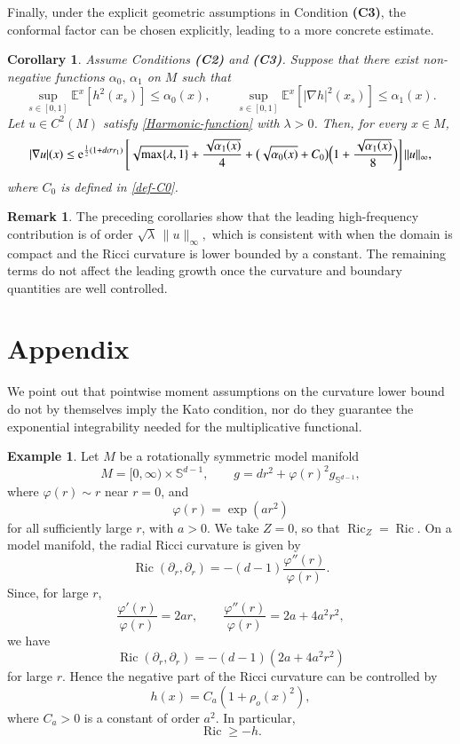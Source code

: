 \documentclass[11pt,twoside, reqno]{article}
\def\e{{\rm e}}
\newcommand\1{\mathbbm{1}}
\newtheorem{corollary}[theorem]{Corollary}
\theoremstyle{definition}
\newtheorem{remark}[theorem]{Remark}
\newtheorem{example}{Example}[section]
\numberwithin{equation}{section}
\def \e{{\rm e}}
\begin{document}
Finally, under the explicit
geometric assumptions in Condition {\bf(C3)}, the conformal factor can be
chosen explicitly, leading to a more concrete estimate.

\begin{corollary}
\label{cor:neumann-eigen-explicit-nonconvex}
Assume Conditions {\bf (C2)} and {\bf (C3)}. 
Suppose that there exist non-negative functions \( \alpha_0,\, \alpha_1\) on \(M\)
such that
\[
        \sup_{s\in [0,1]}\mathbb E^x[h^2(x_s)]\leq  {\alpha}_0(x),
        \qquad
        \sup_{s\in [0,1] }\mathbb E^x[|\nabla h|^2(x_s)]
        \leq  {\alpha}_1(x).
\]
Let \(u\in C^2(M)\) satisfy \eqref{Harmonic-function} with \(\lambda>0\). Then, for every \(x\in M\),
\[
        |\nabla u|(x)
        \leq
        \e^{\frac12(1+d\sigma r_1)}
        \left[
        \sqrt{\max\{\lambda,  1\}}
        +
        \frac{\sqrt{ {\alpha}_1(x)}}{4}
        +
        \bigl(\sqrt{ {\alpha}_0(x)}+C_0\bigr)
       \Bigl(1+ \frac{\sqrt{{\alpha}_1(x)}}{8}\Bigr) \right]
        \|u\|_{\infty},
\]
where $C_0$ is defined in \eqref{def-C0}. 
\end{corollary}


\begin{remark}
The preceding corollaries show that the leading high-frequency contribution is
of order
\(
        \sqrt{\lambda}\,\|u\|_{\infty},
\)
which is consistent with \cite{ArnaudonThalmaierWang2020} when the domain is compact
and the Ricci curvature is lower bounded by a constant.  The remaining terms do not affect the leading growth
 once the curvature and
boundary quantities are well controlled. 
\end{remark}

\section{Appendix}

We point out that pointwise moment assumptions on the curvature lower bound
do not by themselves imply the Kato condition, nor do they guarantee the
exponential integrability needed for the multiplicative functional.

\begin{example}\label{no-Kato}
Let \(M\) be a rotationally symmetric model manifold
\[
        M=[0,\infty)\times \mathbb S^{d-1},
        \qquad
        g=dr^2+\varphi(r)^2 g_{\mathbb S^{d-1}},
\]
where \(\varphi(r)\sim r\) near \(r=0\), and
\[
        \varphi(r)=\exp(ar^2)
\]
for all sufficiently large \(r\), with \(a>0\). We take \(Z=0\), so that
\(\operatorname{Ric}_Z=\operatorname{Ric}\). 
On a model manifold, the radial
Ricci curvature is given by
\[
        \operatorname{Ric}(\partial_r,\partial_r)
        =
        -(d-1)\frac{\varphi''(r)}{\varphi(r)}.
\]
Since, for large \(r\),
\[
        \frac{\varphi'(r)}{\varphi(r)}=2ar,
        \qquad
        \frac{\varphi''(r)}{\varphi(r)}
        =
        2a+4a^2r^2,
\]
we have
\[
        \operatorname{Ric}(\partial_r,\partial_r)
        =
        -(d-1)(2a+4a^2r^2)
\]
for large \(r\). Hence the negative part of the Ricci curvature can be
controlled by
\[
        h(x)=C_a(1+\rho_o(x)^2),
\]
where \(C_a>0\) is a constant of order \(a^2\). In particular,
\[
        \operatorname{Ric}\geq -h.
\]
\end{example}
\end{document}
